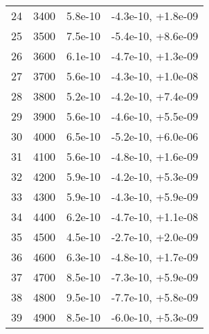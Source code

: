 \begin{table}
\begin{adjustbox}{width=1\textwidth/2}
\begin{tabular}{|c|c|c|c|}
\cline{1-4}
24 & 3400 & 5.8e-10 & -4.3e-10, +1.8e-09 \\
\cline{1-4}
25 & 3500 & 7.5e-10 & -5.4e-10, +8.6e-09 \\
\cline{1-4}
26 & 3600 & 6.1e-10 & -4.7e-10, +1.3e-09 \\
\cline{1-4}
27 & 3700 & 5.6e-10 & -4.3e-10, +1.0e-08 \\
\cline{1-4}
28 & 3800 & 5.2e-10 & -4.2e-10, +7.4e-09 \\
\cline{1-4}
29 & 3900 & 5.6e-10 & -4.6e-10, +5.5e-09 \\
\cline{1-4}
30 & 4000 & 6.5e-10 & -5.2e-10, +6.0e-06 \\
\cline{1-4}
31 & 4100 & 5.6e-10 & -4.8e-10, +1.6e-09 \\
\cline{1-4}
32 & 4200 & 5.9e-10 & -4.2e-10, +5.3e-09 \\
\cline{1-4}
33 & 4300 & 5.9e-10 & -4.3e-10, +5.9e-09 \\
\cline{1-4}
34 & 4400 & 6.2e-10 & -4.7e-10, +1.1e-08 \\
\cline{1-4}
35 & 4500 & 4.5e-10 & -2.7e-10, +2.0e-09 \\
\cline{1-4}
36 & 4600 & 6.3e-10 & -4.8e-10, +1.7e-09 \\
\cline{1-4}
37 & 4700 & 8.5e-10 & -7.3e-10, +5.9e-09 \\
\cline{1-4}
38 & 4800 & 9.5e-10 & -7.7e-10, +5.8e-09 \\
\cline{1-4}
39 & 4900 & 8.5e-10 & -6.0e-10, +5.3e-09 \\
\cline{1-4}
\end{tabular}
\end{adjustbox}
\end{table}

